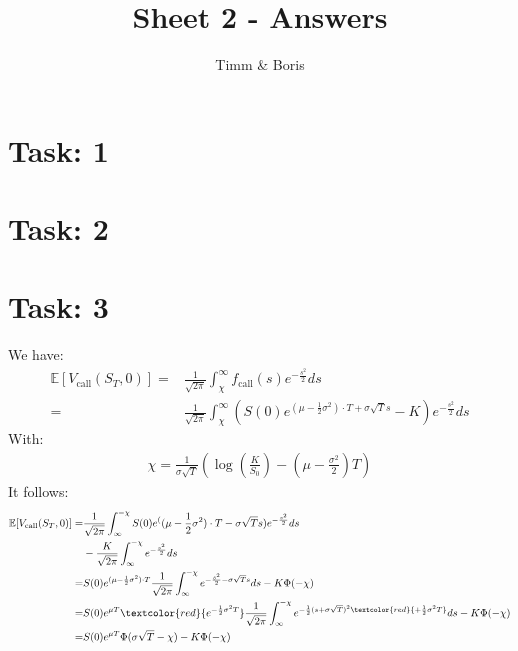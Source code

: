 \documentclass{article}
\title{Sheet 2 - Answers}
\author{Timm \& Boris}
\begin{document}
\maketitle

\section*{Task: 1}

\begin{figure}[htbp]
  \centering
\end{figure}

\section*{Task: 2}

\begin{figure}[htbp]
  \centering
\end{figure}

\section*{Task: 3}

\noindent We have:
\begin{align*}
 \mathbb{E}[V_{\text{call}}(S_T,0)] =& \frac{1}{\sqrt{2 \pi}} \int_{\chi}^\infty f_{\text{call}}(s)e^{-\frac{s^2}{2}}ds\\
  =&\frac{1}{\sqrt{2 \pi}} \int_{\chi}^\infty \left( S(0)e^{(\mu-\frac{1}{2}\sigma^2)\cdot T+\sigma\sqrt{T}s}-K\right)e^{-\frac{s^2}{2}}ds
\end{align*}
With:
\begin{align*}
 \chi = \frac{1}{\sigma \sqrt{T}}\left(\log\left(\frac{K}{S_0}\right)-\left(\mu-\frac{\sigma^2}{2}\right)T\right)
\end{align*}
It follows:
\begin{align*}
 \mathbb{E}[V_{\text{call}}(S_T,0)] = & \frac{1}{\sqrt{2 \pi}} \int_{\infty}^{-\chi} S(0)e^((\mu-\frac{1}{2}\sigma^2)\cdot T-\sigma\sqrt{T}s)e^{-\frac{s^2}{2}}ds\\
                                      & - \frac{K}{\sqrt{2 \pi}} \int_{\infty}^{-\chi} e^{-\frac{s^2}{2}}ds\\
                                    = & S(0) e^{(\mu-\frac{1}{2}\sigma^2)\cdot T}\frac{1}{\sqrt{2 \pi}} \int_{\infty}^{-\chi} e^{-\frac{s^2}{2}-\sigma\sqrt{T}s}ds - K \Phi(-\chi)\\
                                    = & S(0) e^{\mu T}\textcolor{red}{e^{-\frac{1}{2}\sigma^2 T}}\frac{1}{\sqrt{2 \pi}} \int_{\infty}^{-\chi} e^{-\frac{1}{2}(s+\sigma\sqrt{T})^2\textcolor{red}{+\frac{1}{2}\sigma^2 T}}ds - K \Phi(-\chi)\\
                                    = & S(0) e^{\mu T} \Phi(\sigma \sqrt{T} - \chi) - K \Phi(-\chi)
\end{align*}
{\flushright{$\qed$}}
\end{document}
